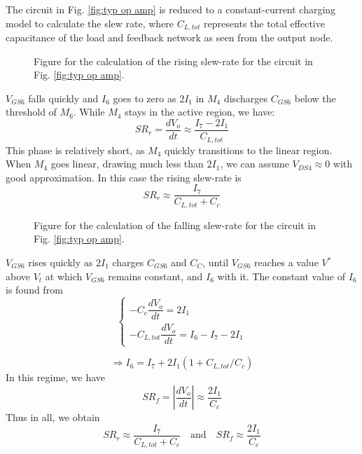\documentclass[12pt, a4paper]{article}%
\begin{document}
The circuit in Fig. \ref{fig:typ op amp} is reduced to a constant-current charging model to calculate the slew rate, where $C_{L,tot}$ represents the total effective capacitance of the load and feedback network as seen from the output node.
\begin{figure}[H]
    \centering
        \resizebox{0.3\linewidth}{!}{
      
    }
    \caption{Figure for the calculation of the rising slew-rate for the circuit in Fig. \ref{fig:typ op amp}.}
    \label{fig:slew rate op amp rising}
\end{figure}

$V_{GS6}$ falls quickly and $I_6$ goes to zero as $2I_1$ in $M_4$ discharges $C_{GS6}$ below the threshold of $M_6$. While $M_4$ stays in the active region, we have:
\begin{equation}
    SR_r = \frac{dV_o}{dt} \approx \frac{I_7 - 2I_1}{C_{L,tot}}
\end{equation}
This phase is relatively short, as $M_4$ quickly transitions to the linear region. When $M_4$ goes linear, drawing much less than $2I_1$, we can assume $V_{DS4} \approx 0$ with good approximation. In this case the rising slew-rate is
\begin{equation}
SR_r \approx \frac{I_7}{C_{L,tot} + C_c}
\end{equation}

\begin{figure}[H]
    \centering
        \resizebox{0.4\linewidth}{!}{
      
    }
    \caption{Figure for the calculation of the falling slew-rate for the circuit in Fig. \ref{fig:typ op amp}.}
    \label{fig:slew rate op amp falling}
\end{figure}

$V_{GS6}$ rises quickly as $2I_1$ charges $C_{GS6}$ and $C_C$, until $V_{GS6}$ reaches a value $V^*$ above $V_t$ at which $V_{GS6}$ remains constant, and $I_6$ with it. The constant value of  $I_6$ is found from 
\begin{equation}
\begin{cases}
-C_c \dfrac{dV_o}{dt} = 2I_1 \\
-C_{L,tot} \dfrac{dV_o}{dt} = I_6 - I_7 - 2I_1
\end{cases}
\end{equation}

\begin{equation}
\Rightarrow I_6 = I_7 + 2I_1 \left( 1 + C_{L,tot}/C_c \right)
\end{equation}
In this regime, we have 
\begin{equation}
    SR_f = \left| \dfrac{dV_o}{dt} \right| \approx \dfrac{2I_1}{C_c}    
\end{equation}
Thus in all, we obtain
\begin{equation}
\boxed{SR_r \approx \frac{I_7}{C_{L,tot} + C_c}} \quad \text{and} \quad \boxed{SR_f \approx \frac{2I_1}{C_c}}
\end{equation}
\end{document}

